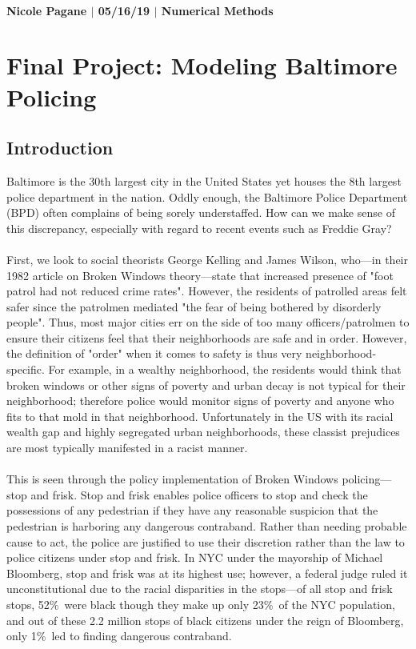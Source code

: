 \documentclass[10pt]{article}
\begin{document}
\paragraph{Nicole Pagane $|$ 05/16/19 $|$ Numerical Methods}

\section*{Final Project: Modeling Baltimore Policing}

\subsection*{Introduction}
Baltimore is the 30th largest city in the United States yet houses the 8th largest police department in the nation. Oddly enough, the Baltimore Police Department (BPD) often complains of being sorely understaffed. How can we make sense of this discrepancy, especially with regard to recent events such as Freddie Gray?\\
\\
First, we look to social theorists George Kelling and James Wilson, who---in their 1982 article on Broken Windows theory---state that increased presence of "foot patrol had not reduced crime rates". However, the residents of patrolled areas felt safer since the patrolmen mediated "the fear of being bothered by disorderly people". Thus, most major cities err on the side of too many officers/patrolmen to ensure their citizens feel that their neighborhoods are safe and in order. However, the definition of "order" when it comes to safety is thus very neighborhood-specific. For example, in a wealthy neighborhood, the  residents would think that broken windows or other signs of poverty and urban decay is not typical for their neighborhood; therefore police would monitor signs of poverty and anyone who fits to that mold in that neighborhood. Unfortunately in the US with its racial wealth gap and highly segregated urban neighborhoods, these classist prejudices are most typically manifested in a racist manner.\\
\\
This is seen through the policy implementation of Broken Windows policing---stop and frisk. Stop and frisk enables police officers to stop and check the possessions of any pedestrian if they have any reasonable suspicion that the pedestrian is harboring any dangerous contraband. Rather than needing  probable cause to act, the police are justified to use their discretion rather than the law to police citizens under stop and frisk. In NYC under the mayorship of Michael Bloomberg, stop and frisk was at its highest use; however, a federal judge ruled it unconstitutional due to the racial disparities in the stops---of all stop and frisk stops, 52\%\ were black though they make up only 23\%\ of the NYC population, and out of these 2.2 million stops of black citizens under the reign of Bloomberg, only 1\%\ led to finding dangerous contraband.\\
\end{document}
